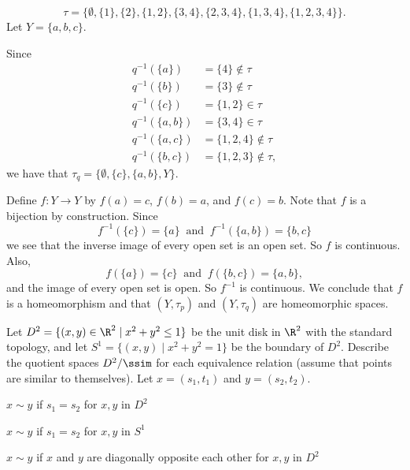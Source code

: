 \[\tau = \{\emptyset, \{1\}, \{2\}, \{1, 2\}, \{3, 4\}, \{2, 3, 4\}, \{1, 3, 4\}, \{1, 2, 3, 4\}\}.\]
Let $Y = \{a, b, c\}$.
\item Since 
\begin{align*}
q^{-1}(\{a\}) &= \{4\} \notin \tau \\
q^{-1}(\{b\}) &= \{3\} \notin \tau \\
q^{-1}(\{c\}) &= \{1,2\} \in \tau \\
q^{-1}(\{a,b\}) &= \{3,4\} \in \tau \\
q^{-1}(\{a,c\}) &= \{1,2,4\} \notin \tau \\
q^{-1}(\{b,c\}) &= \{1,2,3\} \notin \tau,
\end{align*}
we have that $\tau_q = \{\emptyset, \{c\}, \{a,b\}, Y\}$. 

\item Define $f : Y \to Y$ by $f(a) = c$, $f(b) = a$, and $f(c) = b$. Note that $f$ is a bijection by construction. Since 
\[f^{-1}(\{c\}) = \{a\} \ \text{ and } \ f^{-1}(\{a,b\}) = \{b,c\}\]
we see that the inverse image of every open set is an open set. So $f$ is continuous. Also,
\[f(\{a\}) = \{c\} \ \text{ and } \ f(\{b,c\}) = \{a,b\},\]
and the image of every open set is open. So $f^{-1}$ is continuous. We conclude that $f$ is a homeomorphism and that $(Y, \tau_p)$ and $(Y, \tau_q)$ are homeomorphic spaces. 

\ea



\item Let $D^2 = \{(x,y) \in \R^2 \mid x^2+y^2 \leq 1\}$ be the unit disk in $\R^2$ with the standard topology, and let $S^1 = \{(x,y) \mid x^2+y^2 = 1\}$ be the boundary of $D^2$. Describe the quotient spaces $D^2/\ssim$ for each equivalence relation (assume that points are similar to themselves). Let $x = (s_1,t_1)$ and $y = (s_2,t_2)$. 

\ba
\item $x \sim y$ if $s_1=s_2$ for $x, y$ in $D^2$

\item $x \sim y$ if $s_1=s_2$ for $x, y$ in $S^1$

\item $x \sim y$ if $x$ and $y$ are diagonally opposite each other for $x, y$ in $D^2$

\ea



\ExerciseSolution

